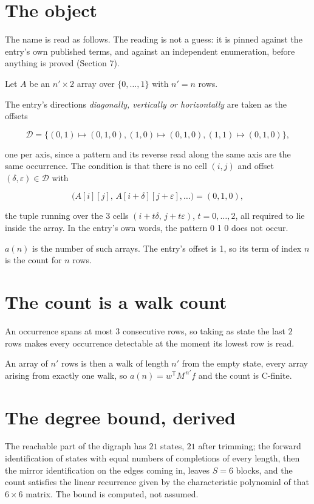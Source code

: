 \documentclass[11pt]{article}
\theoremstyle{definition}
\begin{document}
\section{The object}

The name is read as follows. The reading is not a guess: it is pinned against the entry's own published terms, and against an independent enumeration, before anything is proved (Section 7).

Let $A$ be an $n' \times 2$ array over $\{0,\dots,1\}$ with $n' = n$ rows.

The entry's directions {\itshape diagonally, vertically or horizontally} are taken as the offsets

\[\mathcal{D} = \{(0,1)\mapsto(0,1,0), (1,0)\mapsto(0,1,0), (1,1)\mapsto(0,1,0)\},\]

one per axis, since a pattern and its reverse read along the same axis are the same occurrence. The condition is that there is no cell $(i,j)$ and offset $(\delta,\varepsilon)\in\mathcal{D}$ with

\[\bigl(A[i][j],\,A[i{+}\delta][j{+}\varepsilon],\dots\bigr) = (0, 1, 0),\]

the tuple running over the $3$ cells $(i+t\delta,\,j+t\varepsilon)$, $t = 0,\dots,2$, all required to lie inside the array. In the entry's own words, the pattern 0 1 0 does not occur.

$a(n)$ is the number of such arrays. The entry's offset is 1, so its term of index $n$ is the count for $n$ rows.

\section{The count is a walk count}

An occurrence spans at most $3$ consecutive rows, so taking as state the last $2$ rows makes every occurrence detectable at the moment its lowest row is read.

An array of $n'$ rows is then a walk of length $n'$ from the empty state, every array arising from exactly one walk, so $a(n) = w^{\mathsf T}M^{\,n'}f$ and the count is C-finite.

\section{The degree bound, derived}

The reachable part of the digraph has $21$ states, $21$ after trimming; the forward identification of states with equal numbers of completions of every length, then the mirror identification on the edges coming in, leaves $S = 6$ blocks, and the count satisfies the linear recurrence given by the characteristic polynomial of that $6\times6$ matrix. The bound is computed, not assumed.
\end{document}
